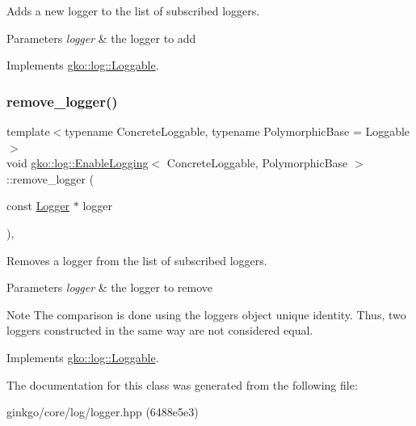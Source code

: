 Adds a new logger to the list of subscribed loggers. 


\begin{DoxyParams}{Parameters}
{\em logger} & the logger to add \\
\hline
\end{DoxyParams}


Implements \hyperlink{classgko_1_1log_1_1Loggable_aa2bb887b5ef7e75fa1a30ee1896ed932}{gko\+::log\+::\+Loggable}.

\mbox{\label{classgko_1_1log_1_1EnableLogging_aba5317f8a03956a61d770e9b07fc65cc}} 
\subsubsection{\texorpdfstring{remove\+\_\+logger()}{remove\_logger()}}
{\footnotesize\ttfamily template$<$typename Concrete\+Loggable, typename Polymorphic\+Base = Loggable$>$ \\
void \hyperlink{classgko_1_1log_1_1EnableLogging}{gko\+::log\+::\+Enable\+Logging}$<$ Concrete\+Loggable, Polymorphic\+Base $>$\+::remove\+\_\+logger (\begin{DoxyParamCaption}\item[{const \hyperlink{classgko_1_1log_1_1Logger}{Logger} $\ast$}]{logger }\end{DoxyParamCaption})\hspace{0.3cm}{\ttfamily [override]}, {\ttfamily [virtual]}}



Removes a logger from the list of subscribed loggers. 


\begin{DoxyParams}{Parameters}
{\em logger} & the logger to remove\\
\hline
\end{DoxyParams}
\begin{DoxyNote}{Note}
The comparison is done using the logger\textquotesingle{}s object unique identity. Thus, two loggers constructed in the same way are not considered equal. 
\end{DoxyNote}


Implements \hyperlink{classgko_1_1log_1_1Loggable_a5de4092a74cf04f30f13636d49aaec8b}{gko\+::log\+::\+Loggable}.



The documentation for this class was generated from the following file\+:\begin{DoxyCompactItemize}
\item 
ginkgo/core/log/logger.\+hpp (6488e5e3)\end{DoxyCompactItemize}
